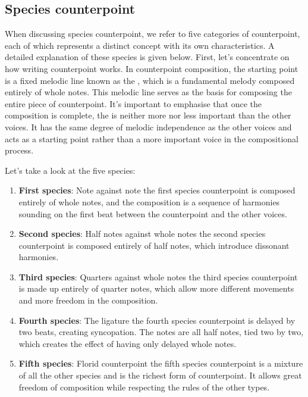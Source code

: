 \subsection{Species counterpoint}\label{section:species-counterpoint}
When discussing species counterpoint, we refer to five categories of counterpoint, each of which represents a distinct concept with its own characteristics. A detailed explanation of these species is given below. First, let's concentrate on how writing counterpoint works. In counterpoint composition, the starting point is a fixed melodic line known as the \cf, which is a fundamental melody composed entirely of whole notes. This melodic line serves as the basis for composing the entire piece of counterpoint. It's important to emphasise that once the composition is complete, the \cf is neither more nor less important than the other voices. It has the same degree of melodic independence as the other voices and acts as a starting point rather than a more important voice in the compositional process.

Let's take a look at the five species:
\begin{enumerate}
    \item \textbf{First species}: Note against note \textendash{} the first species counterpoint is composed entirely of whole notes, and the composition is a sequence of harmonies sounding on the first beat between the counterpoint and the other voices.
    \item \textbf{Second species}: Half notes against whole notes \textendash{} the second species counterpoint is composed entirely of half notes, which introduce dissonant harmonies.
    \item \textbf{Third species}: Quarters against whole notes \textendash{} the third species counterpoint is made up entirely of quarter notes, which allow more different movements and more freedom in the composition.
    \item \textbf{Fourth species}: The ligature \textendash{} the fourth species counterpoint is delayed by two beats, creating syncopation. The notes are all half notes, tied two by two, which creates the effect of having only delayed whole notes.
    \item \textbf{Fifth species}: Florid counterpoint \textendash{} the fifth species counterpoint is a mixture of all the other species and is the richest form of counterpoint. It allows great freedom of composition while respecting the rules of the other types.
\end{enumerate}

